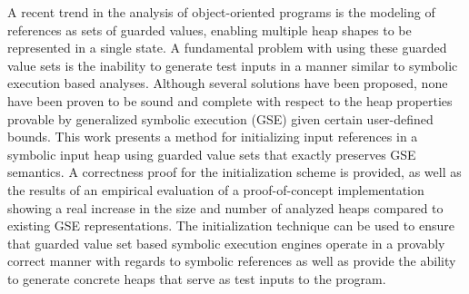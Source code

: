 A recent trend in the analysis of object-oriented programs is the
modeling of references as sets of guarded values, enabling multiple
heap shapes to be represented in a single state.  A fundamental
problem with using these guarded value sets is the inability to
generate test inputs in a manner similar to symbolic execution based
analyses.
Although several solutions have been proposed, none have been proven
to be sound and complete with respect to the heap properties provable
by generalized symbolic execution (GSE) given certain user-defined
bounds. This work presents a method for initializing input references
in a symbolic input heap using guarded value sets that exactly
preserves GSE semantics. A correctness proof for the initialization
scheme is provided, as well as the results of an empirical evaluation
of a proof-of-concept implementation showing a real increase in the
size and number of analyzed heaps compared to existing GSE
representations. The initialization technique can be used to ensure
that guarded value set based symbolic execution engines operate in a
provably correct manner with regards to symbolic references as well as
provide the ability to generate concrete heaps that serve as test
inputs to the program.



